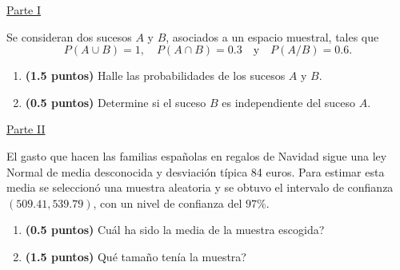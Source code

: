 
\noindent\underline{Parte I}

Se consideran dos sucesos $A$ y $B$, asociados a un espacio muestral, tales que
\[
P(A\cup B)=1,\quad P(A\cap B)=0.3\quad\text{y}\quad P(A/B)=0.6.
\]
\begin{enumerate}[label=\alph*)]
\item \textbf{(1.5 puntos)} Halle las probabilidades de los sucesos $A$ y $B$.
\item \textbf{(0.5 puntos)} Determine si el suceso $B$ es independiente del suceso $A$.
\end{enumerate}
\par\noindent\begin{minipage}{\linewidth}
\noindent\underline{Parte II}

El gasto que hacen las familias españolas en regalos de Navidad sigue una ley Normal de media desconocida y desviación típica 84 euros. Para estimar esta media se seleccionó una muestra aleatoria y se obtuvo el intervalo de confianza $(509.41,539.79)$, con un nivel de confianza del $97\%$.
\begin{enumerate}[label=\alph*)]
\item \textbf{(0.5 puntos)} \textquestiondown{}Cuál ha sido la media de la muestra escogida?
\item \textbf{(1.5 puntos)} \textquestiondown{}Qué tamaño tenía la muestra?
\end{enumerate}
\end{minipage}\par
